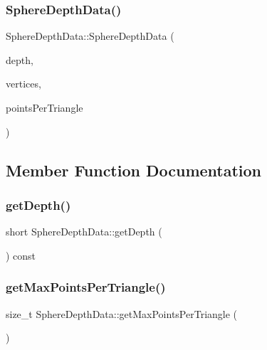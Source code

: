 \mbox{\label{struct_sphere_depth_data_a746de4be5c4ff2bdcbdc1517aa88a4d9}} 
\subsubsection{\texorpdfstring{Sphere\+Depth\+Data()}{SphereDepthData()}\hspace{0.1cm}{\footnotesize\ttfamily [2/2]}}
{\footnotesize\ttfamily Sphere\+Depth\+Data\+::\+Sphere\+Depth\+Data (\begin{DoxyParamCaption}\item[{short}]{depth,  }\item[{std\+::vector$<$ float $>$}]{vertices,  }\item[{std\+::vector$<$ std\+::list$<$ Q\+Vector3D $>$ $>$}]{points\+Per\+Triangle }\end{DoxyParamCaption})}



\subsection{Member Function Documentation}
\mbox{\label{struct_sphere_depth_data_a925a7e0a5486b49151d823471ebe7fe6}} 
\subsubsection{\texorpdfstring{get\+Depth()}{getDepth()}}
{\footnotesize\ttfamily short Sphere\+Depth\+Data\+::get\+Depth (\begin{DoxyParamCaption}{ }\end{DoxyParamCaption}) const}

\mbox{\label{struct_sphere_depth_data_ad151dd50ed037d91aecec6b285a3e342}} 
\subsubsection{\texorpdfstring{get\+Max\+Points\+Per\+Triangle()}{getMaxPointsPerTriangle()}}
{\footnotesize\ttfamily size\+\_\+t Sphere\+Depth\+Data\+::get\+Max\+Points\+Per\+Triangle (\begin{DoxyParamCaption}{ }\end{DoxyParamCaption})}

